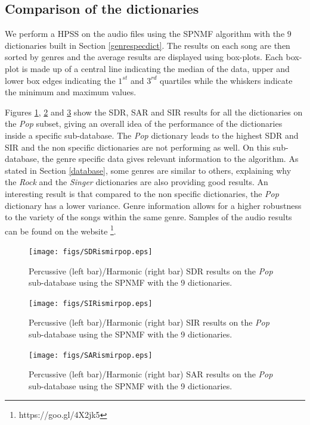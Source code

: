 \documentclass{article}
\begin{document}
\subsection{Comparison of the dictionaries}

We perform a HPSS on the audio files using the SPNMF algorithm with the $9$ dictionaries built in Section \ref{genrespecdict}. The results on each song are then sorted by genres and the average results are displayed using box-plots. Each box-plot is made up of a central line indicating the median of the data, upper and lower box edges indicating the $1^{st}$ and $3^{rd}$ quartiles while the whiskers indicate the minimum and maximum values. 


Figures \ref{sdrpop}, \ref{sirpop} and \ref{sarpop} show the SDR, SAR and SIR results for all the dictionaries on the \emph{Pop} subset, giving an overall idea of the performance of the dictionaries inside a specific sub-database. The \emph{Pop} dictionary leads to the highest SDR and SIR and the non specific dictionaries are not performing as well. On this sub-database, the genre specific data gives relevant information to the algorithm. As stated in Section \ref{database}, some genres are similar to others, explaining why the \emph{Rock} and the \emph{Singer} dictionaries are also providing good results. 
An interesting result is that compared to the non specific dictionaries, the \emph{Pop} dictionary has a lower variance. Genre information allows for a higher robustness to the variety of the songs within the same genre. Samples of the audio results can be found on the website \footnote{https://goo.gl/4X2jk5}.



\begin{figure}[h]

  \centering 
  \texttt{[image: figs/SDRismirpop.eps]}
  \caption{\label{sdrpop} Percussive (left bar)/Harmonic (right bar) SDR results on the \emph{Pop} sub-database using the SPNMF with the 9 dictionaries.}
  
\end{figure}\begin{figure}[h]

  \centering 
  \texttt{[image: figs/SIRismirpop.eps]}
  \caption{\label{sirpop} Percussive (left bar)/Harmonic (right bar) SIR results on the \emph{Pop} sub-database using the SPNMF with the 9 dictionaries.}
  
\end{figure}\begin{figure}[h]

  \centering 
  \texttt{[image: figs/SARismirpop.eps]}
  \caption{\label{sarpop} Percussive (left bar)/Harmonic (right bar) SAR results on the \emph{Pop} sub-database using the SPNMF with the 9 dictionaries.}
  
\end{figure}
\end{document}
